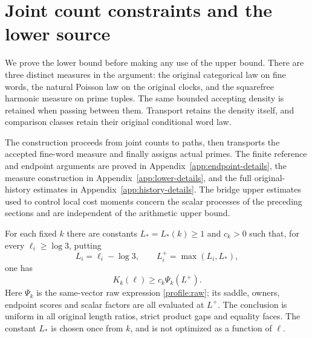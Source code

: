 \section{Joint count constraints and the lower source}
\label{lower:chapter}

We prove the lower bound before making any use of the upper bound.
There are three distinct measures in the argument: the original
categorical law on fine words, the natural Poisson law on the original
clocks, and the squarefree harmonic measure on prime tuples.  The same
bounded accepting density is retained when passing between them.
Transport retains the density itself, and comparison classes retain
their original conditional word law.

The construction proceeds from joint counts to paths, then transports the
accepted fine-word measure and finally assigns actual primes. The finite
reference and endpoint arguments are proved in
Appendix~\ref{app:endpoint-details}, the measure construction in
Appendix~\ref{app:lower-details}, and the full original-history estimates
in Appendix~\ref{app:history-details}. The bridge upper estimates used
to control local cost moments concern the scalar processes of the
preceding sections and are independent of the arithmetic upper bound.

\begin{theorem}
\label{lower:lifted}
For each fixed $k$ there are constants $L_*=L_*(k)\geq1$ and $c_k>0$
such that, for every $\ell_i\geq\log3$, putting
\[
 L_i=\ell_i-\log3,\qquad L_i^+=\max(L_i,L_*),
\]
one has
\begin{equation}
 K_k(\ell)\geq c_k\Psi_k(L^+).
 \label{lower:actual}
\end{equation}
Here $\Psi_k$ is the same-vector raw expression
\eqref{profile:raw}; its saddle, owners, endpoint scores and scalar
factors are all evaluated at $L^+$.  The conclusion is uniform in
all original length ratios, strict product gaps and equality faces.
The constant $L_*$ is chosen once from $k$, and is not optimized as a
function of $\ell$.
\end{theorem}

